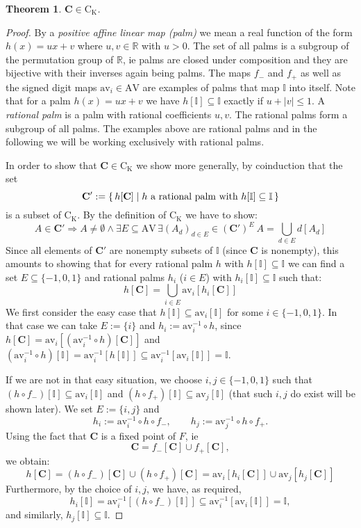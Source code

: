 \documentclass[microtype]{jloganal}
\theoremstyle{plain}
\newtheorem{theorem}{Theorem}[section]
\theoremstyle{definition}
\newcommand{\II}{\mathbb{I}}
\newcommand{\RR}{\mathbb{R}}
\newcommand{\AV}{\mathrm{AV}}
\newcommand{\av}[1]{\mathrm{av}_{#1}}
\newcommand{\coco}{\mathrm{C}}
\newcommand{\compact}{\mathrm{K}}
\newcommand{\cantor}{\mathbf{C}}
\newcommand{\fminus}{f_{-}}
\newcommand{\fplus}{f_{+}}
\begin{document}
\begin{theorem}
\label{thm-cantor}
$\cantor\in\coco_{\compact}$.
\end{theorem}
\begin{proof}
By a \emph{positive affine linear map (palm)} we mean a real function of 
the form $h(x) = ux + v$ where $u,v\in\RR$ with $u > 0$. 
The set of all palms is a subgroup of the permutation group of 
$\RR$, ie
palms are closed under composition and they are bijective with their 
inverses again being palms. 
The maps $\fminus$ and $\fplus$ as well as the signed digit maps 
$\av{i}\in\AV$ are examples of palms that map $\II$ into itself.
Note that for a palm $h(x)=ux+v$ we have
$h[\II]\subseteq\II$ exactly if $u+|v|\le 1$.
A \emph{rational palm} is a palm with rational coefficients $u,v$. 
The rational palms form a subgroup of
all palms. The examples above are rational palms and in the following we will
be working exclusively with rational palms.

In order to show that $\cantor\in\coco_{\compact}$ we show more generally,
by coinduction that the set
\[
\cantor' := \{\,h[\cantor]\mid h\hbox{ a rational palm with }
                                h[\II]\subseteq\II\,\} 
\]
is a subset of $\coco_{\compact}$. 
By the definition of $\coco_{\compact}$ we have to show:
\[ A \in \cantor' \Rightarrow A \neq\emptyset \land 
    \exists E \subseteq \AV\, \exists (A_d)_{d\in E} \in (\cantor')^E \ 
      A = \bigcup_{d\in E} d[A_d] \]
Since all elements of $\cantor'$ are nonempty subsets of $\II$ 
(since $\cantor$ is nonempty), this amounts to showing that
for every rational palm $h$ with $h[\II]\subseteq\II$ we can find a set 
$E\subseteq\{-1,0,1\}$ and rational palms $h_i$ ($i\in E$) with 
$h_i[\II]\subseteq\II$ such that: 
\[h[\cantor] = \bigcup_{i\in E} \av{i}[h_i[\cantor]] \] 
We first consider the easy case that $h[\II]\subseteq\av{i}[\II]$ for some
$i\in\{-1,0,1\}$. In that case we can take $E := \{i\}$ and 
$h_i := \av{i}^{-1}\circ h$, since 
$h[\cantor] = \av{i}[(\av{i}^{-1}\circ h)[\cantor]]$
and $(\av{i}^{-1}\circ h)[\II] = \av{i}^{-1}[h[\II]] \subseteq 
\av{i}^{-1}[\av{i}[\II]] = \II$.


If we are not in that easy situation, we choose $i,j\in\{-1,0,1\}$ such that
$(h\circ \fminus)[\II] \subseteq \av{i}[\II]$ and 
$(h\circ \fplus)[\II] \subseteq \av{j}[\II]$ (that such $i,j$ do exist will be 
shown later). We set $E := \{i,j\}$ and 
\[ h_{i} := \av{i}^{-1}\circ h\circ \fminus,\qquad
   h_{j} := \av{j}^{-1}\circ h\circ \fplus.\]
Using the fact that $\cantor$ is a fixed point of $F$, ie
\[\cantor = \fminus[\cantor] \cup \fplus[\cantor],\]
we obtain:
\[ h[\cantor] = (h\circ\fminus)[\cantor] \cup (h\circ\fplus)[\cantor]
 = \av{i}[h_i[\cantor]] \cup \av{j}[h_j[\cantor]]
\]
Furthermore, by the choice of $i,j$, we have, as required,
\[ h_i[\II] = \av{i}^{-1}[(h\circ\fminus)[\II]] \subseteq 
\av{i}^{-1}[\av{i}[\II]] = \II,\]
and similarly, $h_j[\II] \subseteq \II$.



\end{proof}
\end{document}

